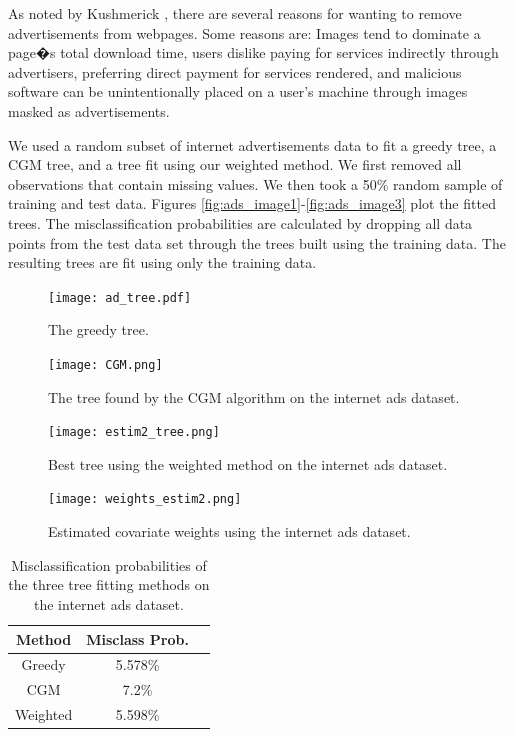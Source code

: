 As noted by Kushmerick \cite{kushmerick1999learning}, there are several reasons for wanting to remove advertisements from webpages. Some reasons are: Images tend to dominate a page�s total download time, users dislike paying for services indirectly through advertisers, preferring direct payment for services rendered, and malicious software can be unintentionally placed on a user's machine through images masked as advertisements. 

We used a random subset of internet advertisements data to fit a greedy tree, a CGM tree, and a tree fit using our weighted method. We first removed all observations that contain missing values. We then took a 50\% random sample of training and test data. Figures \ref{fig:ads_image1}-\ref{fig:ads_image3} plot the fitted trees. The misclassification probabilities are calculated by dropping all data points from the test data set through the trees built using the training data. The resulting trees are fit using only the training data.  
\begin{figure}[h]
\label{fig:3fig_tree}
  \texttt{[image: ad\_tree.pdf]}
  \caption[The greedy algorithm tree for the internet ads dataset]{The greedy tree.}\label{fig:ads_image1}
\endminipage\hfill
\hspace{-1cm}
  \texttt{[image: CGM.png]}
  \caption[The CGM algorithm tree for the internet ads dataset]{The tree found by the CGM algorithm on the internet ads dataset.}\label{fig:ads_image2}
\endminipage\hfill
\end{figure}
\begin{figure}
%
  \texttt{[image: estim2\_tree.png]}
  \caption[The weighted method tree for the internet ads dataset]{Best tree using the weighted method on the internet ads dataset.}\label{fig:ads_image3}
\endminipage\hfill
{}%
\hspace{-1cm}
  \texttt{[image: weights\_estim2.png]}
  \caption[Estimated covariate weights for the internet ads dataset]{Estimated covariate weights using the internet ads dataset.}\label{fig:ads_image4}
\label{fig:uci_cov_weights}
\endminipage
\end{figure}
\begin{table}[h]\footnotesize
\centering
  \begin{tabular}{| c | c | c }
  \hline 
Method & Misclass Prob.\\
      \hline 
Greedy & 5.578\% \\ %
 CGM &   7.2\% \\%
   Weighted & 5.598\% \\%
      \hline
  \end{tabular}
    \caption[Misclassification probabilities for internet ads dataset]{Misclassification probabilities of the three tree fitting methods on the internet ads dataset.}
      \label{tab:misclass_uci}
\centering
\end{table}

